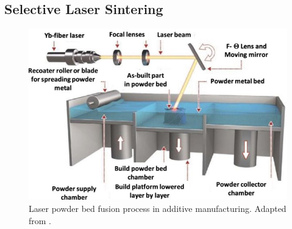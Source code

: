 \subsection{Selective Laser Sintering}
\label{subsec:LPBF}
\begin{figure}
    \centering
    \includegraphics[scale=1.2]{Images/PBF.jpg}
    \caption[Laser PBF in AM.]{Laser powder bed fusion process in additive manufacturing. Adapted from \cite{ozel_focus_2020}.}
    \label{fig:PBF}
\end{figure}
